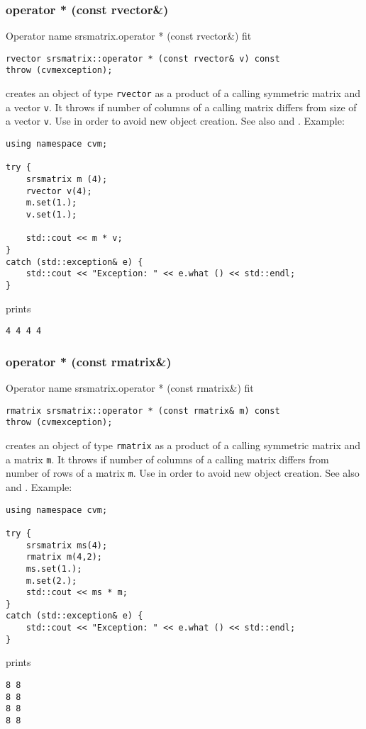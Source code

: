 \subsubsection{operator * (const rvector\&)}
Operator%
\pdfdest name {srsmatrix.operator * (const rvector&)} fit
\begin{verbatim}
rvector srsmatrix::operator * (const rvector& v) const
throw (cvmexception);
\end{verbatim}
creates an object of type \verb"rvector"
as a product of a calling symmetric matrix and a vector \verb"v".
It throws  
if  number of columns of a calling matrix
differs from  size of a vector \verb"v".
Use 
in order to avoid new object creation.
See also
 and .
Example:
\begin{Verbatim}
using namespace cvm;

try {
    srsmatrix m (4);
    rvector v(4);
    m.set(1.);
    v.set(1.);

    std::cout << m * v;
}
catch (std::exception& e) {
    std::cout << "Exception: " << e.what () << std::endl;
}
\end{Verbatim}
prints
\begin{Verbatim}
4 4 4 4
\end{Verbatim}
\newpage



\subsubsection{operator * (const rmatrix\&)}
Operator%
\pdfdest name {srsmatrix.operator * (const rmatrix&)} fit
\begin{verbatim}
rmatrix srsmatrix::operator * (const rmatrix& m) const
throw (cvmexception);
\end{verbatim}
creates an object of type \verb"rmatrix"
as a product of a calling symmetric matrix and a matrix \verb"m".
It throws  
if  number of columns of a calling matrix
differs from  number of rows of a matrix \verb"m".
Use  in order to avoid
 new object creation.
See also
 and .
Example:
\begin{Verbatim}
using namespace cvm;

try {
    srsmatrix ms(4);
    rmatrix m(4,2);
    ms.set(1.);
    m.set(2.);
    std::cout << ms * m;
}
catch (std::exception& e) {
    std::cout << "Exception: " << e.what () << std::endl;
}
\end{Verbatim}
prints
\begin{Verbatim}
8 8
8 8
8 8
8 8
\end{Verbatim}
\newpage



